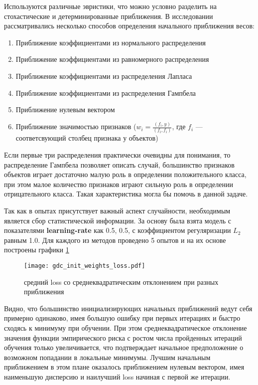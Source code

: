 \documentclass{article}
\begin{document}
        Используются различные эвристики, что можно условно разделить на стохастические и детерминированные приближения. В исследовании рассматривались несколько способов определения начального приближения весов:

        \begin{enumerate}
            \item Приближение коэффициентами из нормального распределения
            \item Приближение коэффициентами из равномерного распределения
            \item Приближение коэффициентами из распределения Лапласа
            \item Приближение коэффициентами из распределения Гампбела
            \item Приближение нулевым вектором
            \item Приближение значимостью признаков ($w_i = \frac{(f_i, y)}{(f_i, f_i)}$, где $f_i$ — соответсвующий столбец признака у объектов)
        \end{enumerate}

        \begin{leftrule}
            Если первые три распределения практически очевидны для понимания, то распределение Гампбела позволяет описать случай, большинство признаков объектов играет достаточно малую роль в определении положительного класса, при этом малое количество признаков играют сильную роль в определении отрицательного класса. Такая характеристика могла бы помочь в данной задаче. 
        \end{leftrule}
        
        Так как в опытах присутствует важный аспект случайности, необходимым является сбор статистической информации. За основу была взята модель с показателями \textbf{learning-rate} как 0.5, 0.5, с коэффициентом регуляризации $L_2$ равным 1.0. Для каждого из методов проведено 5 опытов и на их основе построены графики \ref{fig:gdc_init_weigths_loss}

    \begin{figure}[h]
        \centering
        \texttt{[image: gdc\_init\_weights\_loss.pdf]}
        \caption{средний loss со среднеквадратическим отклонением при разных приближения}
        \label{fig:gdc_init_weigths_loss}
    \end{figure}

        Видно, что большинство инициализирующих начальных приближений ведут себя примерно одинаково, имея большую ошибку при первых итерациях и быстро сходясь к минимуму при обучении. При этом среднеквадратическое отклонение значения функции эмпирического риска с ростом числа пройденных итераций обучения только увеличивается, что подтверждает начальное предположение о возможном попадании в локальные минимумы. Лучшим начальным приближением в этом плане оказалось приближением нулевым вектором, имея наименьшую дисперсию и наилучший loss начиная с первой же итерации. 
\end{document}
